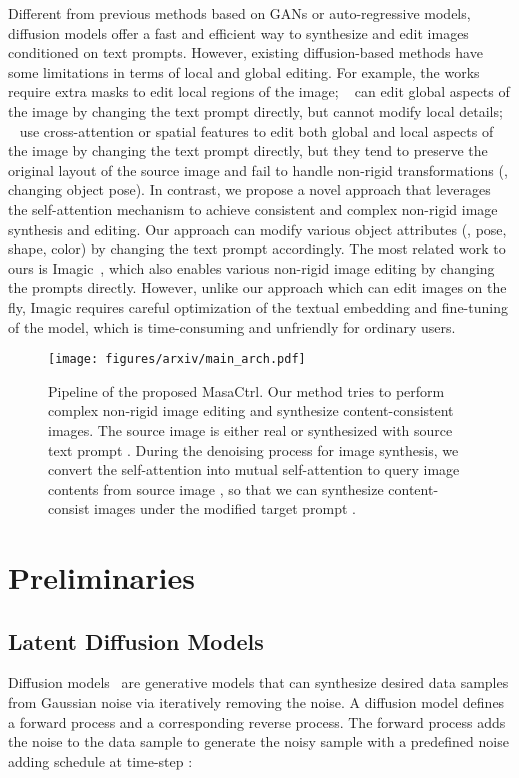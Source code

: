 \documentclass[10pt,twocolumn,letterpaper]{article}
\begin{document}
Different from previous methods based on GANs or auto-regressive models, diffusion models offer a fast and efficient way to synthesize and edit images conditioned on text prompts. However, existing diffusion-based methods have some limitations in terms of local and global editing. For example, the works~\cite{nichol2021glide, avrahami2022blended} require extra masks to edit local regions of the image; ~\cite{kim2022diffusionclip} can edit global aspects of the image by changing the text prompt directly, but cannot modify local details; ~\cite{hertz2022prompt,tumanyan2022plug} use cross-attention or spatial features to edit both global and local aspects of the image by changing the text prompt directly, but they tend to preserve the original layout of the source image and fail to handle non-rigid transformations (\eg, changing object pose). In contrast, we propose a novel approach that leverages the self-attention mechanism to achieve consistent and complex non-rigid image synthesis and editing. Our approach can modify various object attributes (\eg, pose, shape, color) by changing the text prompt accordingly. The most related work to ours is Imagic~\cite{kawar2022imagic}, which also enables various non-rigid image editing by changing the prompts directly. However, unlike our approach which can edit images on the fly, Imagic requires careful optimization of the textual embedding and fine-tuning of the model, which is time-consuming and unfriendly for ordinary users.


\begin{figure*}
    \centering
    \texttt{[image: figures/arxiv/main\_arch.pdf]}
    \caption{Pipeline of the proposed MasaCtrl. Our method tries to perform complex non-rigid image editing and synthesize content-consistent images. The source image is either real or synthesized with source text prompt . During the denoising process for image synthesis, we convert the self-attention into mutual self-attention to query image contents from source image , so that we can synthesize content-consist images under the modified target prompt . } 
    \label{fig:main_arch}
\end{figure*}

\section{Preliminaries}
\subsection{Latent Diffusion Models}
Diffusion models~\cite{ho2020denoising, song2020denoising, nichol2021improved} are generative models that can synthesize desired data samples from Gaussian noise via iteratively removing the noise. 
A diffusion model defines a forward process and a corresponding reverse process. The forward process adds the noise to the data sample  to generate the noisy sample  with a predefined noise adding schedule  at time-step :
\end{document}

